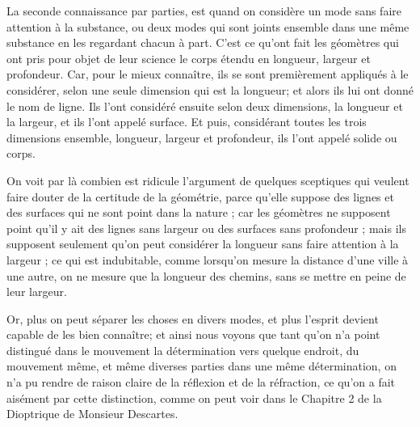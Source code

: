 La seconde connaissance par parties, est quand on considère un mode sans faire attention à la substance, ou deux modes qui sont joints ensemble dans une même substance en les regardant chacun à part. C'est ce qu'ont fait les géomètres qui ont pris pour objet de leur science le corps étendu en longueur, largeur et profondeur. Car, pour le mieux connaître, ils se sont premièrement appliqués à le considérer, selon une seule dimension qui est la longueur; et alors ils lui ont donné le nom de ligne. Ils l'ont considéré ensuite selon deux dimensions, la longueur et la largeur, et ils l'ont appelé surface. Et puis, considérant toutes les trois dimensions ensemble, longueur, largeur et profondeur, ils l'ont appelé solide ou corps.

On voit par là combien est ridicule l'argument de quelques sceptiques qui veulent faire douter de la certitude de la géométrie, parce qu'elle suppose des lignes et des surfaces qui ne sont point dans la nature ; car les géomètres ne supposent point qu'il y ait des lignes sans largeur ou des surfaces sans profondeur ; mais ils supposent seulement qu'on peut considérer la longueur sans faire attention à la largeur ; ce qui est indubitable, comme lorsqu'on mesure la distance d'une ville à une autre, on ne mesure que la longueur des chemins, sans se mettre en peine de leur largeur.

Or, plus on peut séparer les choses en divers modes, et plus l'esprit devient capable de les bien connaître; et ainsi nous voyons que tant qu'on n'a point distingué dans le mouvement la détermination vers quelque endroit, du mouvement même, et même diverses parties dans une même détermination, on n'a pu rendre de raison claire de la réflexion et de la réfraction, ce qu'on a fait aisément par cette distinction, comme on peut voir dans le Chapitre 2 de la Dioptrique de Monsieur Descartes.

